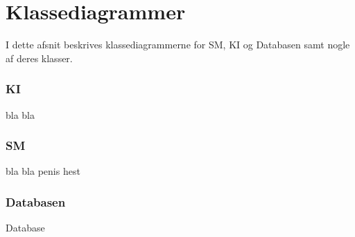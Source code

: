 \chapter{Klassediagrammer}
I dette afsnit beskrives klassediagrammerne for SM, KI og Databasen samt nogle af deres klasser.
\subsection{KI}
bla bla
\subsection{SM}
bla bla penis hest

\subsection{Databasen}
Database
